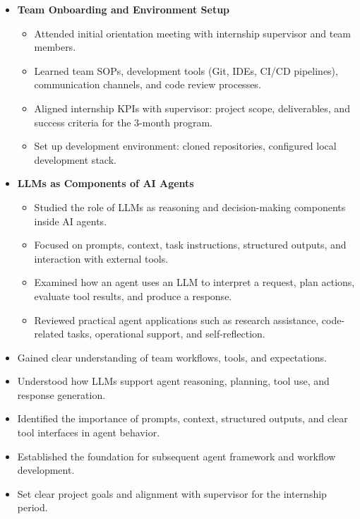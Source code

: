 \begin{itemize}
    \item \textbf{Team Onboarding and Environment Setup}
    \begin{itemize}
        \item Attended initial orientation meeting with internship supervisor and team members.
        \item Learned team SOPs, development tools (Git, IDEs, CI/CD pipelines), communication channels, and code review processes.
        \item Aligned internship KPIs with supervisor: project scope, deliverables, and success criteria for the 3-month program.
        \item Set up development environment: cloned repositories, configured local development stack.
    \end{itemize}

    \item \textbf{LLMs as Components of AI Agents}
    \begin{itemize}
        \item Studied the role of LLMs as reasoning and decision-making components inside AI agents.
        \item Focused on prompts, context, task instructions, structured outputs, and interaction with external tools.
        \item Examined how an agent uses an LLM to interpret a request, plan actions, evaluate tool results, and produce a response.
        \item Reviewed practical agent applications such as research assistance, code-related tasks, operational support, and self-reflection.
    \end{itemize}
\end{itemize}


\begin{itemize}
    \item Gained clear understanding of team workflows, tools, and expectations.
    \item Understood how LLMs support agent reasoning, planning, tool use, and response generation.
    \item Identified the importance of prompts, context, structured outputs, and clear tool interfaces in agent behavior.
    \item Established the foundation for subsequent agent framework and workflow development.
    \item Set clear project goals and alignment with supervisor for the internship period.
\end{itemize}

